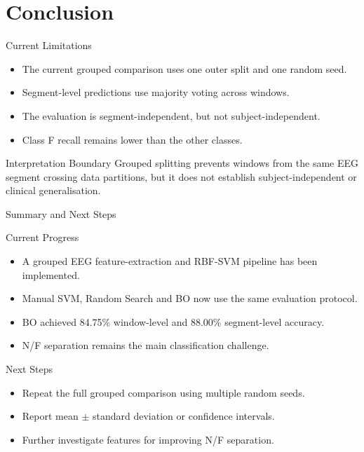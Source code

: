 \documentclass{beamer}
\begin{document}
\section{Conclusion}
\begin{frame}{Current Limitations}
  \begin{itemize}
    \item The current grouped comparison uses one outer split and one random seed.
    \item Segment-level predictions use majority voting across windows.
    \item The evaluation is segment-independent, but not subject-independent.
    \item Class F recall remains lower than the other classes.
  \end{itemize}

  \begin{block}{Interpretation Boundary}
    Grouped splitting prevents windows from the same EEG segment crossing
    data partitions, but it does not establish subject-independent or clinical generalisation.
  \end{block}
\end{frame}

\begin{frame}{Summary and Next Steps}
  \begin{block}{Current Progress}
    \begin{itemize}
      \item A grouped EEG feature-extraction and RBF-SVM pipeline has been implemented.
      \item Manual SVM, Random Search and BO now use the same evaluation protocol.
      \item BO achieved 84.75\% window-level and 88.00\% segment-level accuracy.
      \item N/F separation remains the main classification challenge.
    \end{itemize}
  \end{block}

  \begin{block}{Next Steps}
    \begin{itemize}
      \item Repeat the full grouped comparison using multiple random seeds.
      \item Report mean $\pm$ standard deviation or confidence intervals.
      \item Further investigate features for improving N/F separation.
    \end{itemize}
  \end{block}
\end{frame}
\end{document}
